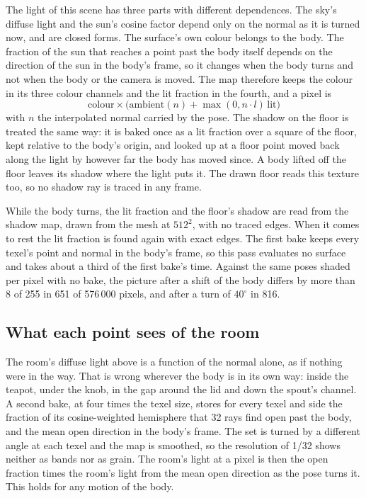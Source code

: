 \documentclass[journal]{IEEEtran}
\begin{document}
The light of this scene has three parts with different dependences. The
sky's diffuse light and the sun's cosine factor depend only on the
normal as it is turned now, and are closed forms. The surface's own
colour belongs to the body. The fraction of the sun that reaches a point
past the body itself depends on the direction of the sun in the body's
frame, so it changes when the body turns and not when the body or the
camera is moved. The map therefore keeps the colour in its three colour
channels and the lit fraction in the fourth, and a pixel is
\[
 \text{colour}\times\bigl(\text{ambient}(n)+\max(0,n\cdot l)\,\text{lit}\bigr)
\]
with $n$ the interpolated normal carried by the pose. The shadow on the
floor is treated the same way: it is baked once as a lit fraction over a
square of the floor, kept relative to the body's origin, and looked up
at a floor point moved back along the light by however far the body has
moved since. A body lifted off the floor leaves its shadow where the
light puts it. The drawn floor reads this texture too, so no shadow ray
is traced in any frame.

While the body turns, the lit fraction and the floor's shadow are read
from the shadow map, drawn from the mesh at $512^2$, with no traced
edges. When it comes to rest the lit fraction is found again with exact
edges. The first bake keeps every texel's point and normal in the body's
frame, so this pass evaluates no surface and takes about a third of the first
bake's time.
Against the same poses shaded per pixel with no bake, the picture after
a shift of the body differs by more than 8 of 255 in 651 of 576\,000
pixels, and after a turn of $40^\circ$ in 816.

\subsection{What each point sees of the room}

The room's diffuse light above is a function of the normal alone, as if
nothing were in the way. That is wrong wherever the body is in its
own way: inside the teapot, under the knob, in the gap around the lid
and down the spout's channel. A second bake, at four times the texel
size, stores for every texel and side the fraction of
its cosine-weighted hemisphere that 32 rays find open past the body, and
the mean open direction in the body's frame. The set is turned by a different
angle at each texel and the map is smoothed, so the resolution of 1/32
shows neither as bands nor as grain. The room's light at a pixel is then
the open fraction times the room's light from the mean open direction as
the pose turns it. This holds for any motion of the body.
\end{document}
